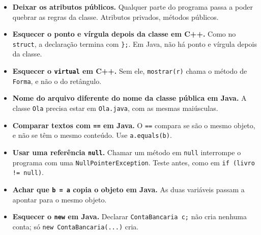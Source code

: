 \begin{itemize}
  \item \textbf{Deixar os atributos públicos.} Qualquer parte do programa passa a poder quebrar as regras da classe. Atributos privados, métodos públicos.
  \item \textbf{Esquecer o ponto e vírgula depois da classe em C++.} Como no \texttt{struct}, a declaração termina com \texttt{\};}. Em Java, não há ponto e vírgula depois da classe.
  \item \textbf{Esquecer o \texttt{virtual} em C++.} Sem ele, \texttt{mostrar(r)} chama o método de \texttt{Forma}, e não o do retângulo.
  \item \textbf{Nome do arquivo diferente do nome da classe pública em Java.} A classe \texttt{Ola} precisa estar em \texttt{Ola.java}, com as mesmas maiúsculas.
  \item \textbf{Comparar textos com \texttt{==} em Java.} O \texttt{==} compara se são o mesmo objeto, e não se têm o mesmo conteúdo. Use \texttt{a.equals(b)}.
  \item \textbf{Usar uma referência \texttt{null}.} Chamar um método em \texttt{null} interrompe o programa com uma \texttt{NullPointerException}. Teste antes, como em \texttt{if (livro != null)}.
  \item \textbf{Achar que \texttt{b = a} copia o objeto em Java.} As duas variáveis passam a apontar para o mesmo objeto.
  \item \textbf{Esquecer o \texttt{new} em Java.} Declarar \texttt{ContaBancaria c;} não cria nenhuma conta; só \texttt{new ContaBancaria(...)} cria.
\end{itemize}
